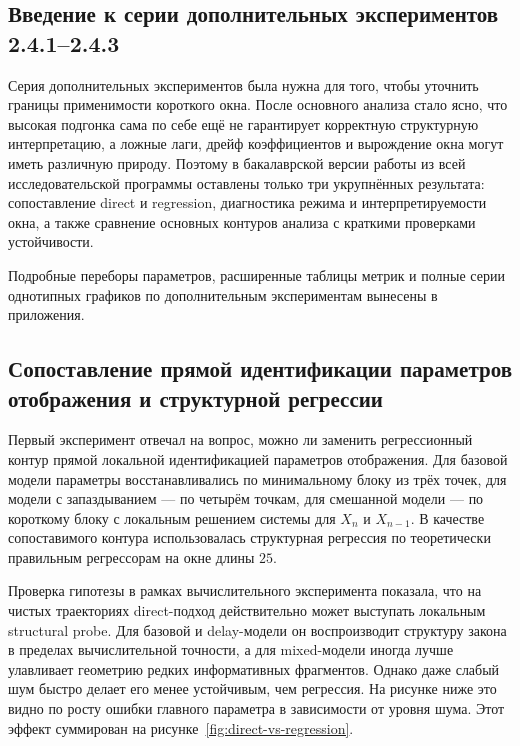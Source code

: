 \subsection*{Введение к серии дополнительных экспериментов 2.4.1--2.4.3}

Серия дополнительных экспериментов была нужна для того, чтобы уточнить границы применимости короткого окна. После основного анализа стало ясно, что высокая подгонка сама по себе ещё не гарантирует корректную структурную интерпретацию, а ложные лаги, дрейф коэффициентов и вырождение окна могут иметь различную природу. Поэтому в бакалаврской версии работы из всей исследовательской программы оставлены только три укрупнённых результата: сопоставление direct и regression, диагностика режима и интерпретируемости окна, а также сравнение основных контуров анализа с краткими проверками устойчивости.

Подробные переборы параметров, расширенные таблицы метрик и полные серии однотипных графиков по дополнительным экспериментам вынесены в приложения.

\setcounter{subsection}{0}

\subsection{Сопоставление прямой идентификации параметров отображения и структурной регрессии}
\label{sec:sopostavlenie-pryamoi-identifikatsii-parametrov-otobrazheniya-i-strukturnoi-regressii}

Первый эксперимент отвечал на вопрос, можно ли заменить регрессионный контур прямой локальной идентификацией параметров отображения. Для базовой модели параметры восстанавливались по минимальному блоку из трёх точек, для модели с запаздыванием --- по четырём точкам, для смешанной модели --- по короткому блоку с локальным решением системы для \(X_n\) и \(X_{n-1}\). В качестве сопоставимого контура использовалась структурная регрессия по теоретически правильным регрессорам на окне длины \(25\).

Проверка гипотезы в рамках вычислительного эксперимента показала, что на чистых траекториях direct-подход действительно может выступать локальным structural probe. Для базовой и delay-модели он воспроизводит структуру закона в пределах вычислительной точности, а для mixed-модели иногда лучше улавливает геометрию редких информативных фрагментов. Однако даже слабый шум быстро делает его менее устойчивым, чем регрессия. На рисунке ниже это видно по росту ошибки главного параметра в зависимости от уровня шума.
Этот эффект суммирован на рисунке~\ref{fig:direct-vs-regression}.

